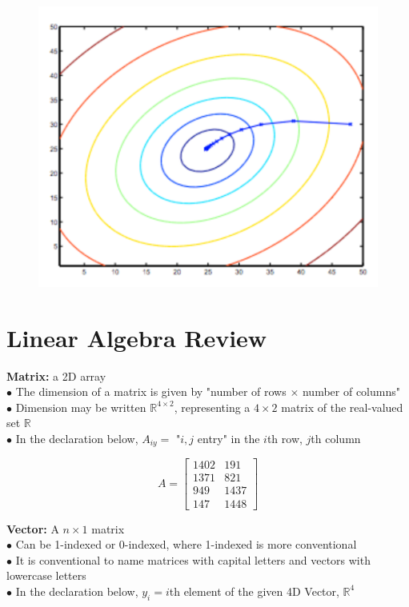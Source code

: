 \documentclass{article}
\begin{document}
        \begin{figure}[hbt!]
            \centering
            \includegraphics[scale=0.75]{Resources/Contour2}
        \end{figure}



    \pagebreak
    \section{Linear Algebra Review}
        \textbf{Matrix:} a 2D array \\
        $\bullet$ The dimension of a matrix is given by "number of rows $\times$ number of columns" \\
        $\bullet$ Dimension may be written $\mathbb{R}^{4\times 2}$, representing a $4\times2$ matrix of the
        real-valued set $\mathbb{R}$ \\
        $\bullet$ In the declaration below, $A_{iy}=$ "$i,j$ entry" in the $i$th row, $j$th column

        \begin{equation*}
            A = \begin{bmatrix}
                    1402 & 191 \\
                    1371 & 821 \\
                    949  & 1437 \\
                    147  & 1448
                \end{bmatrix}
        \end{equation*}

        \noindent \textbf{Vector:} A $n\times1$ matrix \\
        $\bullet$ Can be 1-indexed or 0-indexed, where 1-indexed is more conventional \\
        $\bullet$ It is conventional to name matrices with capital letters and vectors with lowercase letters \\
        $\bullet$ In the declaration below, $y_i=i$th element of the given 4D Vector, $\mathbb{R}^4$
\end{document}
